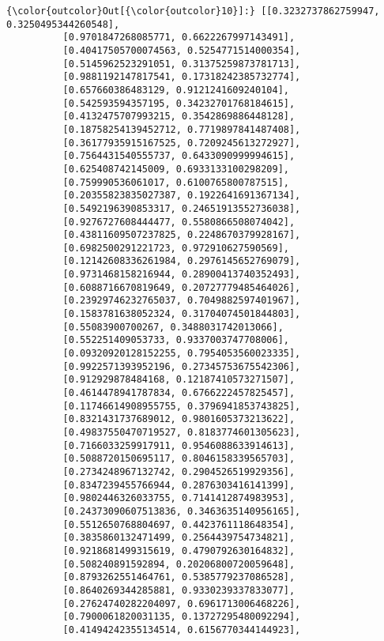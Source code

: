 \documentclass[11pt]{article}
\begin{document}
\begin{Verbatim}[commandchars=\\\{\}]
{\color{outcolor}Out[{\color{outcolor}10}]:} [[0.3232737862759947, 0.3250495344260548],
          [0.9701847268085771, 0.6622267997143491],
          [0.40417505700074563, 0.5254771514000354],
          [0.5145962523291051, 0.31375259873781713],
          [0.9881192147817541, 0.17318242385732774],
          [0.657660386483129, 0.9121241609240104],
          [0.542593594357195, 0.34232701768184615],
          [0.4132475707993215, 0.3542869886448128],
          [0.18758254139452712, 0.7719897841487408],
          [0.36177935915167525, 0.7209245613272927],
          [0.7564431540555737, 0.6433090999994615],
          [0.625408742145009, 0.6933133100298209],
          [0.759990536061017, 0.6100765800787515],
          [0.20355823835027387, 0.1922641691367134],
          [0.5492196390853317, 0.24651913552736038],
          [0.9276727608444477, 0.5580866508074042],
          [0.43811609507237825, 0.2248670379928167],
          [0.6982500291221723, 0.972910627590569],
          [0.12142608336261984, 0.2976145652769079],
          [0.9731468158216944, 0.28900413740352493],
          [0.6088716670819649, 0.20727779485464026],
          [0.23929746232765037, 0.7049882597401967],
          [0.1583781638052324, 0.31704074501844803],
          [0.55083900700267, 0.3488031742013066],
          [0.552251409053733, 0.9337003747708006],
          [0.09320920128152255, 0.7954053560023335],
          [0.9922571393952196, 0.27345753675542306],
          [0.912929878484168, 0.12187410573271507],
          [0.4614478941787834, 0.6766222457825457],
          [0.11746614908955755, 0.3796941853743825],
          [0.8321431737689012, 0.9801605373213622],
          [0.49837550470719527, 0.8183774601305623],
          [0.7166033259917911, 0.9546088633914613],
          [0.5088720150695117, 0.8046158339565703],
          [0.2734248967132742, 0.2904526519929356],
          [0.8347239455766944, 0.2876303416141399],
          [0.9802446326033755, 0.7141412874983953],
          [0.24373090607513836, 0.3463635140956165],
          [0.5512650768804697, 0.4423761118648354],
          [0.3835860132471499, 0.2564439754734821],
          [0.9218681499315619, 0.4790792630164832],
          [0.508240891592894, 0.20206800720059648],
          [0.8793262551464761, 0.5385779237086528],
          [0.8640269344285881, 0.9330239337833077],
          [0.27624740282204097, 0.6961713006468226],
          [0.7900061820031135, 0.13727295480092294],
          [0.41494242355134514, 0.6156770344144923],

\end{Verbatim}
\end{document}
